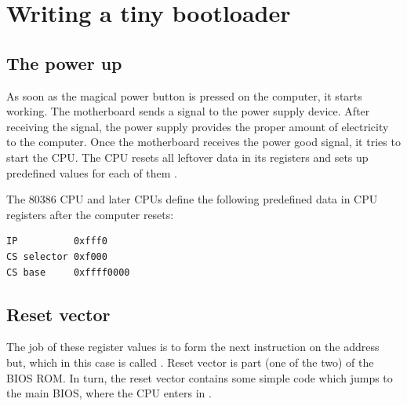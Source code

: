 \documentclass[a4paper]{article}
\begin{document}






\newpage
\tableofcontents
\newpage



\section{Writing a tiny bootloader}


\subsection{The power up}

As soon as the magical power button is pressed on the computer, it starts working. The motherboard sends a signal to the power supply device. After receiving the signal, the power supply provides the proper amount of electricity to the computer. Once the motherboard receives the power good signal, it tries to start the CPU. The CPU resets all leftover data in its registers and sets up predefined values for each of them \cite{linuxinsides}.

The 80386 CPU and later CPUs define the following predefined data in CPU registers after the computer resets:
\begin{verbatim}
IP          0xfff0
CS selector 0xf000
CS base     0xffff0000
\end{verbatim}

\subsection{Reset vector}
The job of these register values is to form the next instruction on the address but, which in this case is called . Reset vector is part (one of the two) of the BIOS ROM. In turn, the reset vector contains some simple code which jumps to the main BIOS, where the CPU enters in . 
\end{document}
